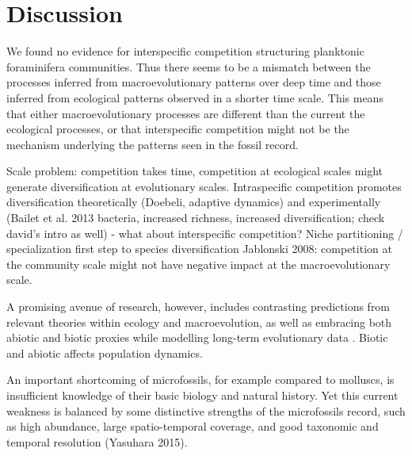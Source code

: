 \documentclass[a4paper]{article}
\begin{document}
\section{Discussion}


We found no evidence for interspecific competition structuring planktonic foraminifera communities. Thus there seems to be a mismatch between the processes inferred from macroevolutionary patterns over deep time and those inferred from ecological patterns observed in a shorter time scale. This means that either macroevolutionary processes are different than the current the ecological processes, or that interspecific competition might not be the mechanism underlying the patterns seen in the fossil record.

Scale problem: competition takes time, competition at ecological scales might generate diversification at evolutionary scales. 
Intraspecific competition promotes diversification theoretically (Doebeli, adaptive dynamics) and experimentally (Bailet et al. 2013 bacteria, increased richness, increased diversification; check david's intro as well) - what about interspecific competition? Niche partitioning / specialization first step to species diversification
Jablonski 2008: competition at the community scale might not have negative impact at the macroevolutionary scale.


A promising avenue of research, however, includes contrasting predictions from relevant theories within ecology and macroevolution, as well as embracing both abiotic and biotic proxies while modelling long-term evolutionary data \citep{voje2015role}. Biotic and abiotic affects population dynamics.

An important shortcoming of microfossils, for example compared to molluscs, is insufficient knowledge of their basic biology and natural history. Yet this current weakness is balanced by some distinctive strengths of the microfossils record, such as high abundance, large spatio-temporal coverage, and good taxonomic and temporal resolution (Yasuhara 2015).
\end{document}
